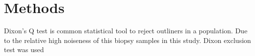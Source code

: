\chapter{Methods}

Dixon's Q test is common statistical tool to reject outliners in a population. Due to the relative high noiseness of this biopsy samples in this study. Dixon  exclusion test was used 
